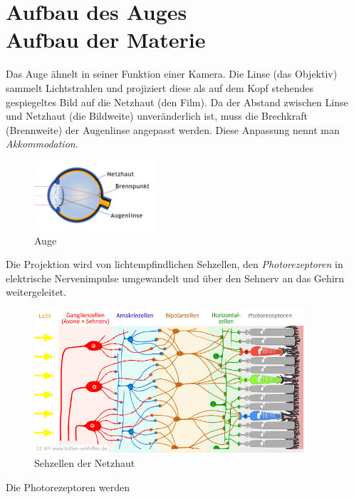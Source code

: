 \section[Aufbau des Auges\hfill Aufbau der Materie]{Aufbau des Auges\\{\normalsize Aufbau der Materie}}
\label{sec:auge}

Das Auge ähnelt in seiner Funktion einer Kamera. Die Linse (das Objektiv) sammelt Lichtstrahlen und projiziert diese als auf dem Kopf stehendes gespiegeltes Bild auf die Netzhaut (den Film). Da der Abstand zwischen Linse und Netzhaut (die Bildweite) unveränderlich ist, muss die Brechkraft (Brennweite) der Augenlinse angepasst werden. Diese Anpassung nennt man \textit{Akkommodation}.

\begin{figure}
	\centering
	\includegraphics[width=4.5cm]{images/auge.png}
	\caption{Auge \cite{abadi:fehlsichtigkeit}}
\end{figure}

Die Projektion wird von lichtempfindlichen Sehzellen, den \textit{Photorezeptoren} in elektrische Nervenimpulse umgewandelt und über den Sehnerv an das Gehirn weitergeleitet.

\begin{figure}
	\centering
	\includegraphics[width=10cm]{images/netzhaut.png}
	\caption{Sehzellen der Netzhaut \cite{bs:auge}}
\end{figure}

Die Photorezeptoren werden 